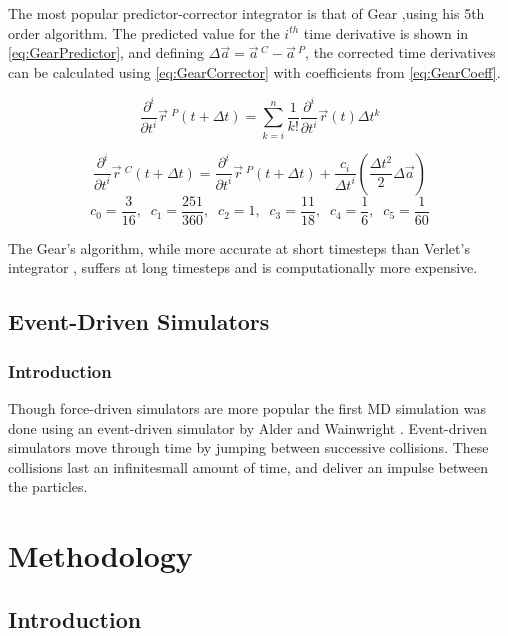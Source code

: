 \documentclass[12pt]{UoAthesis}
\begin{document}
The most popular predictor-corrector integrator is that of Gear
\cite{Gear1971},using his 5th order algorithm. The predicted value for the
$i^{th}$ time
derivative is shown in \eqref{eq:GearPredictor}, and defining $\Delta \vec{a} =
\vec{a}\,^{C} - \vec{a}\,^{P}$, the corrected time derivatives can be
calculated using \eqref{eq:GearCorrector} with coefficients from
\eqref{eq:GearCoeff}.

\begin{equation} \frac{\partial^{i}}{\partial t^{i}} \vec{r}\:^{P}(t+\Delta t)
=\sum^{n}_{k=i} \frac{1}{k!}\frac{\partial^{i} }{\partial t^{i}} \vec{r}(t)
\Delta t^{k} \label{eq:GearPredictor} \end{equation}

\begin{equation} 
\frac{\partial^{i}}{\partial t^{i}} \vec{r}\:^{C}(t+\Delta t)
=\frac{\partial^{i} }{\partial t^{i}} \vec{r}\:^{P}(t+\Delta t)
+\frac{c_i}{\Delta t^i} \left(\frac{\Delta t^2}{2}\Delta \vec{a}\right)
\label{eq:GearCorrector} \end{equation} \begin{equation} c_0 =
\frac{3}{16},\;\;c_1 = \frac{251}{360},\;\; c_2 = 1,\;\; c_3 =
\frac{11}{18},\;\; c_4 =
\frac{1}{6},\;\; c_5 = \frac{1}{60} \label{eq:GearCoeff} 
\end{equation}

The Gear's algorithm, while more accurate at short timesteps than Verlet's
integrator \cite{Haile1997}, suffers at long timesteps and is computationally
more expensive.

\section{Event-Driven Simulators} 
\subsection{Introduction} 
Though force-driven
simulators are more popular the first MD simulation was done using an
event-driven simulator by Alder and Wainwright \cite{Alder1959}. Event-driven
simulators move through time by jumping between successive collisions. These
collisions last an infinitesmall amount of time, and deliver an impulse between
the particles. 
\chapter{Methodology} 
\section{Introduction} 
\end{document}
